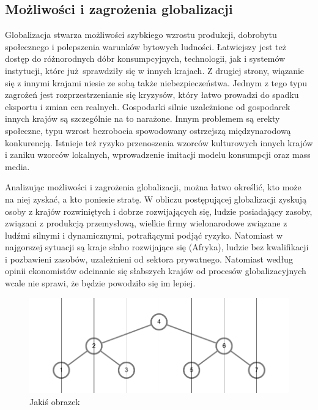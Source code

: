 \documentclass[12pt]{extarticle}
\begin{document}
\subsection{Możliwości i zagrożenia globalizacji}

Globalizacja stwarza możliwości szybkiego wzrostu produkcji, dobrobytu społecznego i polepszenia warunków bytowych ludności. Łatwiejszy jest też dostęp do różnorodnych dóbr konsumpcyjnych, technologii, jak i systemów instytucji, które już sprawdziły się w innych krajach. Z drugiej strony, wiązanie się z innymi krajami niesie ze sobą także niebezpieczeństwa. Jednym z tego typu zagrożeń jest rozprzestrzenianie się kryzysów, który łatwo prowadzi do spadku eksportu i zmian cen realnych. Gospodarki silnie uzależnione od gospodarek innych krajów są szczególnie na to narażone. Innym problemem są erekty społeczne, typu wzrost bezrobocia spowodowany ostrzejszą międzynarodową konkurencją. Istnieje też ryzyko przenoszenia wzorców kulturowych innych krajów i zaniku wzorców lokalnych, wprowadzenie imitacji modelu konsumpcji oraz mass media.

Analizując możliwości i zagrożenia globalizacji, można łatwo określić, kto może na niej zyskać, a kto poniesie stratę. W obliczu postępującej globalizacji zyskują osoby z krajów rozwiniętych i dobrze rozwijających się, ludzie posiadający zasoby, związani z produkcją przemysłową, wielkie firmy wielonarodowe związane z ludźmi silnymi i dynamicznymi, potrafiącymi podjąć ryzyko. Natomiast w najgorszej sytuacji są kraje słabo rozwijające się (Afryka), ludzie bez kwalifikacji i pozbawieni zasobów, uzależnieni od sektora prywatnego. Natomiast według opinii ekonomistów odcinanie się słabszych krajów od procesów globalizacyjnych wcale nie sprawi, że będzie powodziło się im lepiej.


\begin{figure}[H]
\centering
\includegraphics[width=15cm]{sample}
\caption{Jakiś obrazek}
\end{figure}


\clearpage\mbox{}\clearpage
\end{document}
